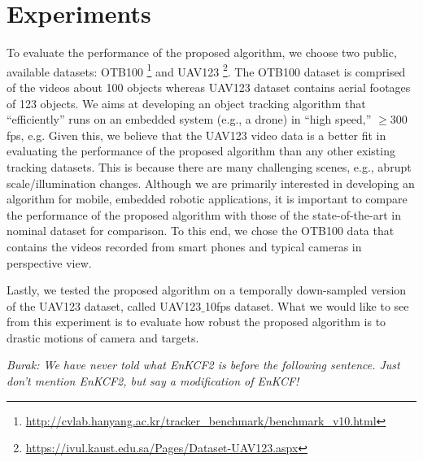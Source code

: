 \documentclass{bmvc2k}
\begin{document}
\section{Experiments} \label{sc:Experiments}
To evaluate the performance of the proposed algorithm, we choose two
public, available datasets:
OTB100 \footnote{\url{http://cvlab.hanyang.ac.kr/tracker_benchmark/benchmark_v10.html}}
and
UAV123 \footnote{\url{https://ivul.kaust.edu.sa/Pages/Dataset-UAV123.aspx}}\cite{mueller2016uav123}.
The OTB100 dataset is comprised of the videos about 100 objects
whereas UAV123 dataset contains aerial footages of 123 objects. We
aims at developing an object tracking algorithm that ``efficiently''
runs on an embedded system (e.g., a drone) in ``high speed,'' $\ge
300$ fps, e.g. Given this, we believe that the UAV123 video data is a
better fit in evaluating the performance of the proposed algorithm
than any other existing tracking datasets. This is because there are
many challenging scenes, e.g., abrupt scale/illumination
changes. Although we are primarily interested in developing an
algorithm for mobile, embedded robotic applications, it is important
to compare the performance of the proposed algorithm with those of the
state-of-the-art in nominal dataset for comparison. To this end, we
chose the OTB100 data that contains the videos recorded from smart
phones and typical cameras in perspective view. 

Lastly, we tested the proposed algorithm on a temporally down-sampled
version of the UAV123 dataset, called UAV123$\_$10fps dataset. What we
would like to see from this experiment is to evaluate how robust the
proposed algorithm is to drastic motions of camera and targets. 

{\it Burak: We have never told what EnKCF2 is before the following sentence. Just don't mention EnKCF2, but say a modification of EnKCF!}

\end{document}
